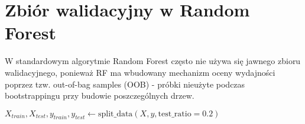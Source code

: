 \documentclass{article}
\begin{document}
\section{Zbiór walidacyjny w Random Forest}
W standardowym algorytmie Random Forest często nie używa się jawnego zbioru walidacyjnego,
ponieważ RF ma wbudowany mechanizm oceny wydajności poprzez tzw. out-of-bag samples (OOB) - próbki nieużyte
podczas bootstrappingu przy budowie poszczególnych drzew.

\begin{comment}
ogólnie myśle że zbior walidacyjny nie jest specjalnie potrzebny - acc poszczegolnych drzew zrobiłoby się na zbiorach OBB, bardziej skłaniałbym sie nad zbiorem testowym i trenujacym tylko.
\end{comment}

\begin{algorithmic}
\State $X_{train}, X_{test}, y_{train}, y_{test} \gets \text{split\_data}(X, y, \text{test\_ratio}=0.2)$
\end{algorithmic}
\end{document}
